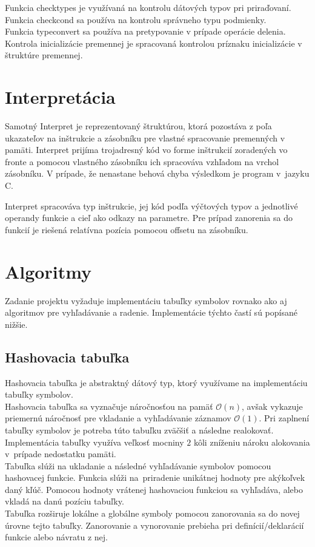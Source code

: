 \documentclass[a4paper]{article}
\begin{document}
Funkcia checktypes je využívaná na kontrolu dátových typov pri priraďovaní.\\
Funkcia checkcond sa používa na kontrolu správneho typu podmienky.\\
Funkcia typeconvert sa používa na pretypovanie v prípade operácie delenia.\\
Kontrola inicializácie premennej je spracovaná kontrolou príznaku inicializácie v štruktúre premennej.


\section{Interpretácia}
Samotný Interpret je reprezentovaný štruktúrou, ktorá pozostáva z poľa ukazateľov na inštrukcie a zásobníku pre vlastné spracovanie premenných v pamäti. Interpret prijíma trojadresný kód vo forme inštrukcií zoradených vo fronte a pomocou vlastného zásobníku ich spracováva vzhľadom na vrchol zásobníku. V prípade, že nenastane behová chyba výsledkom je program v~jazyku C.

Interpret spracováva typ inštrukcie, jej kód podľa výčtových typov a jednotlivé operandy funkcie a cieľ ako odkazy na parametre. Pre prípad zanorenia sa do funkcií je riešená relatívna pozícia pomocou offsetu na zásobníku.

\section{Algoritmy}
Zadanie projektu vyžaduje implementáciu tabuľky symbolov rovnako ako aj algoritmov pre vyhľadávanie a radenie. Implementácie týchto častí sú popísané nižšie. 

\subsection{Hashovacia tabuľka}
Hashovacia tabuľka je abstraktný dátový typ, ktorý využívame na implementáciu tabuľky symbolov. \\
Hashovacia tabuľka sa vyznačuje náročnosťou na pamäť $\mathcal{O}(n)$, avšak vykazuje priemernú náročnosť pre vkladanie a vyhľadávanie záznamov $\mathcal{O}(1)$. Pri zaplnení tabuľky symbolov je potreba túto tabuľku zväčšiť a následne realokovať. Implementácia tabuľky využíva veľkosť mocniny $2$ kôli zníženiu nároku alokovania v~prípade nedostatku pamäti.\\
Tabuľka slúži na ukladanie a následné vyhľadávanie symbolov pomocou hashovacej funkcie. Funkcia slúži na~priradenie unikátnej hodnoty pre akýkoľvek daný kľúč. Pomocou hodnoty vrátenej hashovaciou funkciou sa vyhľadáva, alebo vkladá na danú pozíciu tabuľky.\\ 
Tabuľka rozširuje lokálne a globálne symboly pomocou zanorovania sa do novej úrovne tejto tabuľky. Zanorovanie a vynorovanie prebieha pri definícií/deklarácií funkcie alebo návratu z nej. 
\end{document}
